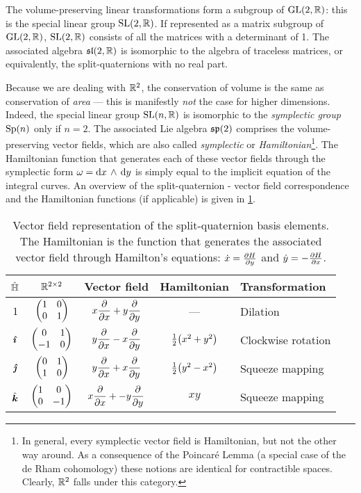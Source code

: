 The volume-preserving linear transformations form a subgroup of $\glgroup{2}{\real}$: this is the special linear group $\slgroup{2}{\real}$. If represented as a matrix subgroup of $\glgroup{2}{\real}$, $\slgroup{2}{\real}$ consists of all the matrices with a determinant of 1. The associated algebra $\slalg{2}{\real}$ is isomorphic to the algebra of traceless matrices, or equivalently, the split-quaternions with no real part.

Because we are dealing with $\real^2$, the conservation of volume is the same as conservation of \emph{area} --- this is manifestly \emph{not} the case for higher dimensions.  Indeed, the special linear group $\slgroup{n}{\real}$ is isomorphic to the \emph{symplectic group} $\spgroup{n}$ only if $n = 2$. The associated Lie algebra $\spalg{2}$ comprises the volume-preserving vector fields, which are also called \emph{symplectic} or \emph{Hamiltonian}\footnote{In general, every symplectic vector field is Hamiltonian, but not the other way around. As a consequence of the Poincaré Lemma (a special case of the de Rham cohomology) these notions are identical for contractible spaces. Clearly, $\real^2$ falls under this category.}. The Hamiltonian function that generates each of these vector fields through the symplectic form $\omega = \wedgep{\dd{x}}{\dd{y}}$ is simply equal to the implicit equation of the integral curves. An overview of the split-quaternion - vector field correspondence and the Hamiltonian functions (if applicable) is given in \cref{tab:basis_vf}.

\begin{table}[ht!]
    \centering
    \caption{Vector field representation of the split-quaternion basis elements. The Hamiltonian is the function that generates the associated vector field through Hamilton's equations: $\dot{x} = \pdv{H}{y}$ and $\dot{y} = -\pdv{H}{x}$.}
    \label{tab:basis_vf}
    \begin{tabular}{ccccl}
        \toprule
        $\spquaternions$ &  $ \real^{2\times 2} $ & \textbf{Vector field} & \textbf{Hamiltonian} & \textbf{Transformation} \\
        \midrule
        $1$ & $\mqty(1 & 0 \\ 0 & 1) $ & $\displaystyle x\pdv{}{x} + y\pdv{}{y} $ & --- & Dilation \\[0.4cm]
        $\quati$ & $\mqty(0 & 1 \\ -1 & 0) $ & $\displaystyle y\pdv{}{x} - x\pdv{}{y} $ & $ \tfrac{1}{2}\qty(x^2 + y^2) $ & Clockwise rotation \\[0.4cm]
        $\quatj$ & $\mqty(0 & 1 \\ 1 & 0) $ & $\displaystyle y\pdv{}{x} + x\pdv{}{y} $ & $ \tfrac{1}{2}\qty(y^2 - x^2) $ & Squeeze mapping \\[0.4cm]
        $\quatk$ & $\mqty(1 & 0 \\ 0 & -1) $ & $\displaystyle x\pdv{}{x} + -y\pdv{}{y} $ & $ xy $ & Squeeze mapping \\[0.4cm]
        \bottomrule
    \end{tabular}
\end{table}

